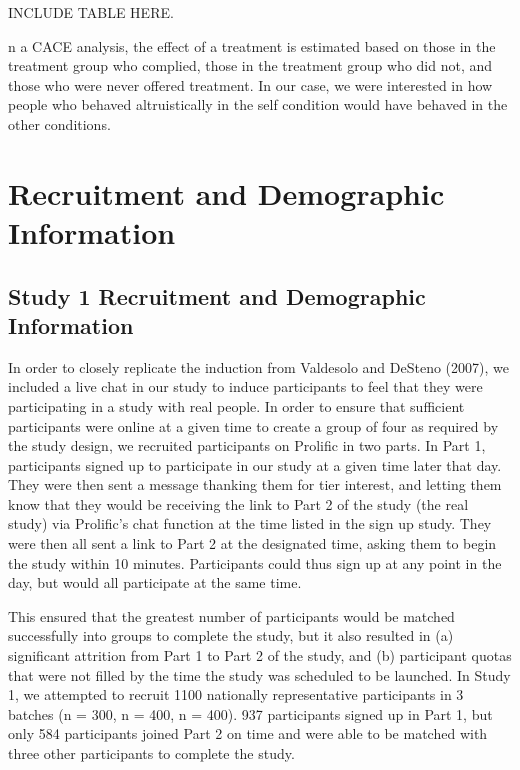 \documentclass[12pt,]{article}
\begin{document}
INCLUDE TABLE HERE. 


n a CACE analysis, the effect of a treatment is estimated based on those in the treatment group who complied, those in the treatment group who did not, and those who were never offered treatment. In our case, we were interested in how people who behaved altruistically in the self condition would have behaved in the other conditions. 





\newpage
\section{Recruitment and Demographic Information}
\label{appendix:recruit}

\subsection{Study 1 Recruitment and Demographic Information}
\label{appendix:recruit_1}

In order to closely replicate the induction from Valdesolo and DeSteno (2007), we included a live chat in our study to induce participants to feel that they were participating in a study with real people. In order to ensure that sufficient participants were online at a given time to create a group of four as required by the study design, we recruited participants on Prolific in two parts. In Part 1, participants signed up to participate in our study at a given time later that day. They were then sent a message thanking them for tier interest, and letting them know that they would be receiving the link to Part 2 of the study (the real study) via Prolific's chat function at the time listed in the sign up study. They were then all sent a link to Part 2 at the designated time, asking them to begin the study within 10 minutes. Participants could thus sign up at any point in the day, but would all participate at the same time. 

This ensured that the greatest number of participants would be matched successfully into groups to complete the study, but it also resulted in (a) significant attrition from Part 1 to Part 2 of the study, and (b) participant quotas that were not filled by the time the study was scheduled to be launched. In Study 1,  we attempted to recruit 1100 nationally representative participants in 3 batches (n = 300, n = 400, n = 400). 937 participants signed up in Part 1, but only 584 participants joined Part 2 on time and were able to be matched with three other participants to complete the study.  
\end{document}

